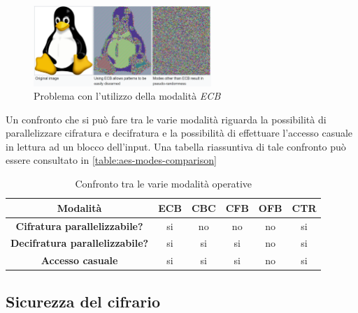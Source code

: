 \begin{itemize}
\end{itemize}

\begin{figure}[h]
    \centering
    \includegraphics[width=0.6\textwidth]{capitoli/figure-crittografia/aes-ecb-linux.png}
    \caption{Problema con l'utilizzo della modalità \emph{ECB}}
    \label{fig:aes-ecb-linux}
\end{figure}

Un confronto che si può fare tra le varie modalità riguarda la possibilità di parallelizzare cifratura e decifratura e la possibilità di effettuare l'accesso casuale in lettura ad un blocco dell'input. Una tabella riassuntiva di tale confronto può essere consultato in \autoref{table:aes-modes-comparison} \cite{wikipedia_aes_modes}

\begin{table}[h]
    \centering
    \begin{tabular}[h]{| c || c | c | c | c | c |}
        \hline
        \textbf{Modalità} & \textbf{ECB} & \textbf{CBC} & \textbf{CFB} & \textbf{OFB} & \textbf{CTR} \\
        \hline
        \textbf{Cifratura parallelizzabile?} & si & no & no & no & si \\
        \hline
        \textbf{Decifratura parallelizzabile?} & si & si & si & no & si \\
        \hline
        \textbf{Accesso casuale} & si & si & si & no & si \\
        \hline
    \end{tabular}
    \caption{Confronto tra le varie modalità operative}
    \label{table:aes-modes-comparison}
\end{table}

\subsection{Sicurezza del cifrario}

\newpage